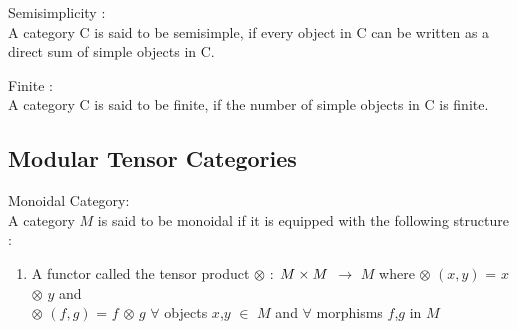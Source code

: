 \begin{defn}
Semisimplicity :\\
          A category C is said to be semisimple, if  every object in C can be written as a direct sum of simple objects in C.
\end{defn}

\begin{defn}
Finite :\\
      A category C is said to be finite, if the number of simple objects in C is finite.
\end{defn}

\subsection{Modular Tensor Categories}
\begin{defn}
Monoidal Category: \\
A category $M$ is said to be monoidal if it is equipped with the following structure :\\
\begin{enumerate}
\item A functor called the tensor product $\otimes$ : $\xymatrix@1{ M\times M}$ $\longrightarrow$ $M$ where $\otimes$ $(x,y)$ = $x$ $\otimes$ $y$ 
   and \\ $\otimes$ $(f,g)$ = $f$ $\otimes$ $g$ $\forall$ objects $x$,$y$ $\in$ $M$ and $\forall$ morphisms $f$,$g$ in $M$ \\
   

\end{enumerate}
\end{defn}
